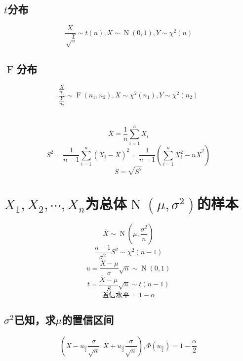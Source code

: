 \documentclass[]{article}
\numberwithin{equation}{section}
\DeclareMathOperator{\N}{N}
\DeclareMathOperator{\F}{F}
\begin{document}
\subsection{$t$分布}
\begin{equation}
    \frac{X}{\sqrt\frac{Y}{n}}\sim t(n),X\sim\N(0,1),Y\sim\chi^2(n)
\end{equation}
\subsection{$\F$分布}
\begin{equation}
    \frac{\frac{X}{n_1}}{\frac{Y}{n_2}}\sim\F(n_1,n_2),X\sim\chi^2(n_1),Y\sim\chi^2(n_2)
\end{equation}

\section{}
\begin{equation}
    \overline{X}=\frac{1}{n}\sum_{i=1}^n X_i
\end{equation}
\begin{equation}
    S^2=\frac{1}{n-1}\sum_{i=1}^n(X_i-\overline{X})^2=\frac{1}{n-1}(\sum_{i=1}^n X_i^2-n\overline{X}^2)
\end{equation}
\begin{equation}
    S=\sqrt{S^2}
\end{equation}

\section{$X_1,X_2,\cdots,X_n$为总体$\N(\mu,\sigma^2)$的样本}
\begin{equation}
    \overline{X}\sim\N(\mu,\frac{\sigma^2}{n})
\end{equation}
\begin{equation}
    \frac{n-1}{\sigma^2}S^2\sim\chi^2(n-1)
\end{equation}
\begin{equation}
    u=\frac{\overline{X}-\mu}{\sigma}\sqrt n\sim\N(0,1)
\end{equation}
\begin{equation}
    t=\frac{\overline{X}-\mu}{S}\sqrt n\sim t(n-1)
\end{equation}
\begin{equation}
    \text{置信水平}=1-\alpha
\end{equation}
\subsection{$\sigma^2$已知，求$\mu$的置信区间}
\begin{equation}
    (\overline{X}-u_\frac{\alpha}{2}\frac{\sigma}{\sqrt n},\overline{X}+u_\frac{\alpha}{2}\frac{\sigma}{\sqrt n}),\Phi(u_\frac{\alpha}{2})=1-\frac{\alpha}{2}
\end{equation}
\end{document}
